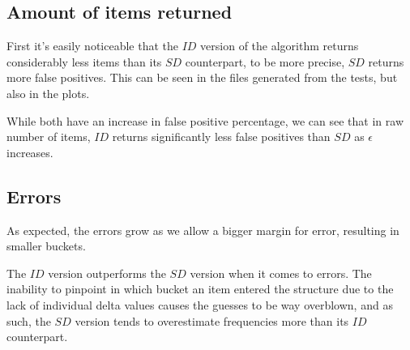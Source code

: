 \documentclass[...]{revdetua}
\begin{document}
\subsection{Amount of items returned}
First it's easily noticeable that the $ID$ version of the algorithm returns considerably less items than its $SD$ counterpart, to be more precise, $SD$ returns more false positives.
This can be seen in the files generated from the tests, but also in the plots. \par
While both have an increase in false positive percentage, we can see that in raw number of items, $ID$ returns significantly less false positives than $SD$ as $\epsilon$ increases.
\subsection{Errors}
As expected, the errors grow as we allow a bigger margin for error, resulting in smaller buckets.\par
The $ID$ version outperforms the $SD$ version when it comes to errors.
The inability to pinpoint in which bucket an item  entered the structure due to the lack of individual delta values causes the guesses to be way overblown, and as such, the $SD$ version tends to overestimate frequencies more than its $ID$ counterpart.
\end{document}
